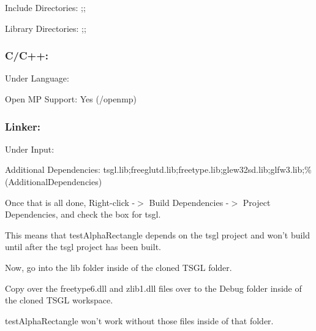 \begin{DoxyItemize}
\item {\ttfamily Include Directories\-:} ;;
\item {\ttfamily Library Directories\-:} ;;
\end{DoxyItemize}

\subsubsection*{C/\-C++\-:}


\begin{DoxyItemize}
\item Under {\ttfamily Language}\-:
\begin{DoxyItemize}
\item {\ttfamily Open M\-P Support\-:} Yes (/openmp)
\end{DoxyItemize}
\end{DoxyItemize}

\subsubsection*{Linker\-:}


\begin{DoxyItemize}
\item Under {\ttfamily Input}\-:
\begin{DoxyItemize}
\item {\ttfamily Additional Dependencies\-:} tsgl.\-lib;freeglutd.\-lib;freetype.\-lib;glew32sd.\-lib;glfw3.\-lib;\%(Additional\-Dependencies)
\end{DoxyItemize}
\end{DoxyItemize}

Once that is all done, {\ttfamily Right-\/click -\/$>$ Build Dependencies -\/$>$ Project Dependencies}, and check the box for {\ttfamily tsgl}.

This means that {\ttfamily test\-Alpha\-Rectangle} depends on the {\ttfamily tsgl} project and won't build until after the {\ttfamily tsgl} project has been built.

Now, go into the {\ttfamily lib} folder inside of the cloned T\-S\-G\-L folder.

Copy over the {\ttfamily freetype6.\-dll} and {\ttfamily zlib1.\-dll} files over to the {\ttfamily Debug} folder inside of the cloned T\-S\-G\-L workspace.

{\ttfamily test\-Alpha\-Rectangle} won't work without those files inside of that folder.

